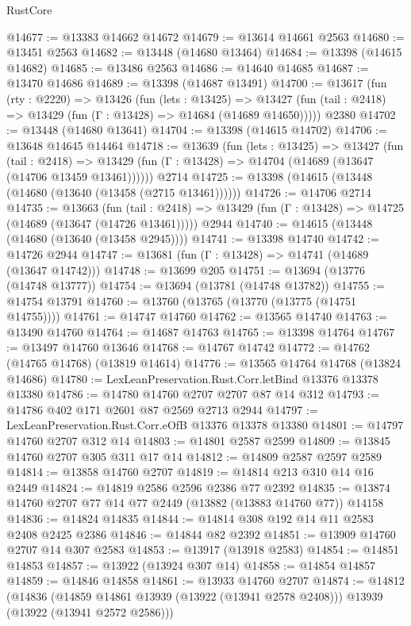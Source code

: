 \begin{lexlean}{RustCore}
\begin{coremodule}
@14677 := @13383 @14662 @14672
@14679 := @13614 @14661 @2563
@14680 := @13451 @2563
@14682 := @13448 (@14680 @13464)
@14684 := @13398 (@14615 @14682)
@14685 := @13486 @2563
@14686 := @14640 @14685
@14687 := @13470 @14686
@14689 := @13398 (@14687 @13491)
@14700 := @13617
    (fun (rty : @2220) =>
    @13426
      (fun (lets : @13425) =>
      @13427 (fun (tail : @2418) => @13429 (fun (Γ : @13428) => @14684 (@14689 @14650)))))
    @2380
@14702 := @13448 (@14680 @13641)
@14704 := @13398 (@14615 @14702)
@14706 := @13648 @14645 @14464
@14718 := @13639
    (fun (lets : @13425) =>
    @13427
      (fun (tail : @2418) =>
      @13429 (fun (Γ : @13428) => @14704 (@14689 (@13647 (@14706 @13459 @13461))))))
    @2714
@14725 := @13398 (@14615 (@13448 (@14680 (@13640 (@13458 (@2715 @13461))))))
@14726 := @14706 @2714
@14735 := @13663
    (fun (tail : @2418) => @13429 (fun (Γ : @13428) => @14725 (@14689 (@13647 (@14726 @13461)))))
    @2944
@14740 := @14615 (@13448 (@14680 (@13640 (@13458 @2945))))
@14741 := @13398 @14740
@14742 := @14726 @2944
@14747 := @13681 (fun (Γ : @13428) => @14741 (@14689 (@13647 @14742)))
@14748 := @13699 @205
@14751 := @13694 (@13776 (@14748 @13777))
@14754 := @13694 (@13781 (@14748 @13782))
@14755 := @14754 @13791
@14760 := @13760 (@13765 (@13770 (@13775 (@14751 @14755))))
@14761 := @14747 @14760
@14762 := @13565 @14740
@14763 := @13490 @14760
@14764 := @14687 @14763
@14765 := @13398 @14764
@14767 := @13497 @14760 @13646
@14768 := @14767 @14742
@14772 := @14762 (@14765 @14768) (@13819 @14614)
@14776 := @13565 @14764 @14768 (@13824 @14686)
@14780 := LexLeanPreservation.Rust.Corr.letBind @13376 @13378 @13380
@14786 := @14780 @14760 @2707 @2707 @87 @14 @312
@14793 := @14786 @402 @171 @2601 @87 @2569 @2713 @2944
@14797 := LexLeanPreservation.Rust.Corr.eOfB @13376 @13378 @13380
@14801 := @14797 @14760 @2707 @312 @14
@14803 := @14801 @2587 @2599
@14809 := @13845 @14760 @2707 @305 @311 @17 @14
@14812 := @14809 @2587 @2597 @2589
@14814 := @13858 @14760 @2707
@14819 := @14814 @213 @310 @14 @16 @2449
@14824 := @14819 @2586 @2596 @2386 @77 @2392
@14835 := @13874 @14760 @2707 @77 @14 @77 @2449 (@13882 (@13883 @14760 @77)) @14158
@14836 := @14824 @14835
@14844 := @14814 @308 @192 @14 @11 @2583 @2408 @2425 @2386
@14846 := @14844 @82 @2392
@14851 := @13909 @14760 @2707 @14 @307 @2583
@14853 := @13917 (@13918 @2583)
@14854 := @14851 @14853
@14857 := @13922 (@13924 @307 @14)
@14858 := @14854 @14857
@14859 := @14846 @14858
@14861 := @13933 @14760 @2707
@14874 := @14812
    (@14836
      (@14859 @14861 @13939 (@13922 (@13941 @2578 @2408)))
      @13939
      (@13922 (@13941 @2572 @2586)))

\end{coremodule}
\end{lexlean}
